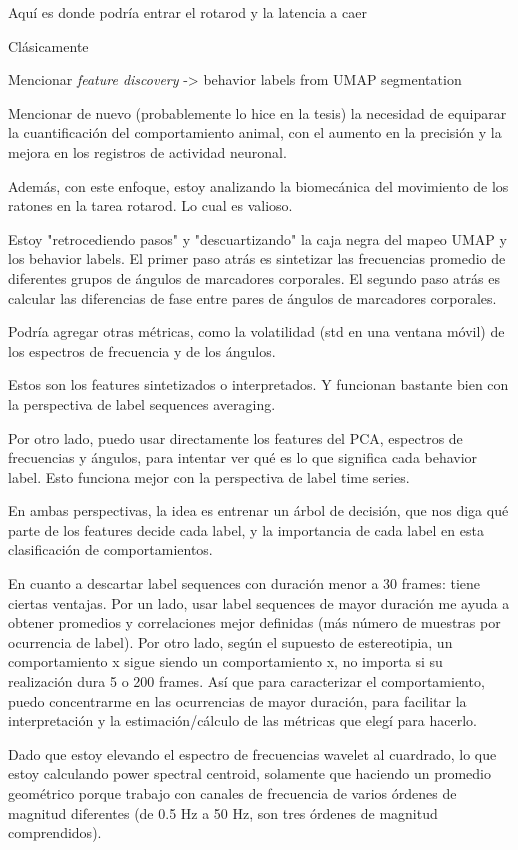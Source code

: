 Aquí es donde podría entrar el rotarod y la latencia a caer

Clásicamente

Mencionar \textit{feature discovery} -> behavior labels from UMAP segmentation

Mencionar de nuevo (probablemente lo hice en la tesis) la necesidad de equiparar la cuantificación del comportamiento animal, con el aumento en la precisión y la mejora en los registros de actividad neuronal.

Además, con este enfoque, estoy analizando la biomecánica del movimiento de los ratones en la tarea rotarod. Lo cual es valioso.

Estoy "retrocediendo pasos" y "descuartizando" la caja negra del mapeo UMAP y los behavior labels. El primer paso atrás es sintetizar las frecuencias promedio de diferentes grupos de ángulos de marcadores corporales. El segundo paso atrás es calcular las diferencias de fase entre pares de ángulos de marcadores corporales.

Podría agregar otras métricas, como la volatilidad (std en una ventana móvil) de los espectros de frecuencia y de los ángulos.

Estos son los features sintetizados o interpretados. Y funcionan bastante bien con la perspectiva de label sequences averaging.

Por otro lado, puedo usar directamente los features del PCA, espectros de frecuencias y ángulos, para intentar ver qué es lo que significa cada behavior label. Esto funciona mejor con la perspectiva de label time series.

En ambas perspectivas, la idea es entrenar un árbol de decisión, que nos diga qué parte de los features decide cada label, y la importancia de cada label en esta clasificación de comportamientos.

En cuanto a descartar label sequences con duración menor a 30 frames: tiene ciertas ventajas.
Por un lado, usar label sequences de mayor duración me ayuda a obtener promedios y correlaciones mejor definidas (más número de muestras por ocurrencia de label).
Por otro lado, según el supuesto de estereotipia, un comportamiento x sigue siendo un comportamiento x, no importa si su realización dura 5 o 200 frames.
Así que para caracterizar el comportamiento, puedo concentrarme en las ocurrencias de mayor duración, para facilitar la interpretación y la estimación/cálculo de las métricas que elegí para hacerlo.

Dado que estoy elevando el espectro de frecuencias wavelet al cuardrado, lo que estoy calculando power spectral centroid, solamente que haciendo un promedio geométrico porque trabajo con canales de frecuencia de varios órdenes de magnitud diferentes (de 0.5 Hz a 50 Hz, son tres órdenes de magnitud comprendidos).

